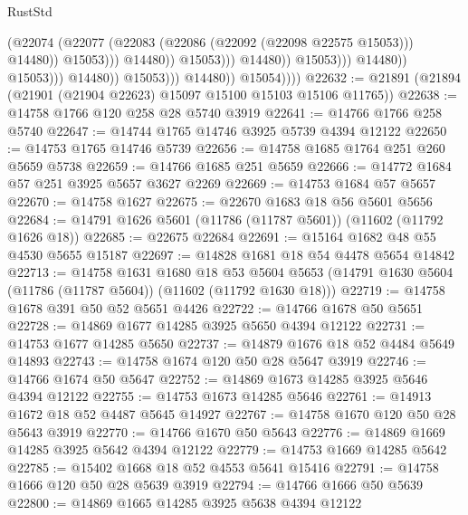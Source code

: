 \begin{lexlean}{RustStd}
\begin{coremodule}
                                                            (@22074
                                                              (@22077
                                                                (@22083
                                                                  (@22086
                                                                    (@22092 (@22098 @22575 @15053)))
                                                                  @14480))
                                                              @15053)))
                                                        @14480))
                                                    @15053)))
                                              @14480))
                                          @15053)))
                                    @14480))
                                @15053)))
                          @14480))
                      @15053)))
                @14480))
            @15054))))
@22632 := @21891 (@21894 (@21901 (@21904 @22623) @15097 @15100 @15103 @15106 @11765))
@22638 := @14758 @1766 @120 @258 @28 @5740 @3919
@22641 := @14766 @1766 @258 @5740
@22647 := @14744 @1765 @14746 @3925 @5739 @4394 @12122
@22650 := @14753 @1765 @14746 @5739
@22656 := @14758 @1685 @1764 @251 @260 @5659 @5738
@22659 := @14766 @1685 @251 @5659
@22666 := @14772 @1684 @57 @251 @3925 @5657 @3627 @2269
@22669 := @14753 @1684 @57 @5657
@22670 := @14758 @1627
@22675 := @22670 @1683 @18 @56 @5601 @5656
@22684 := @14791 @1626 @5601 (@11786 (@11787 @5601)) (@11602 (@11792 @1626 @18))
@22685 := @22675 @22684
@22691 := @15164 @1682 @48 @55 @4530 @5655 @15187
@22697 := @14828 @1681 @18 @54 @4478 @5654 @14842
@22713 := @14758
    @1631
    @1680
    @18
    @53
    @5604
    @5653
    (@14791 @1630 @5604 (@11786 (@11787 @5604)) (@11602 (@11792 @1630 @18)))
@22719 := @14758 @1678 @391 @50 @52 @5651 @4426
@22722 := @14766 @1678 @50 @5651
@22728 := @14869 @1677 @14285 @3925 @5650 @4394 @12122
@22731 := @14753 @1677 @14285 @5650
@22737 := @14879 @1676 @18 @52 @4484 @5649 @14893
@22743 := @14758 @1674 @120 @50 @28 @5647 @3919
@22746 := @14766 @1674 @50 @5647
@22752 := @14869 @1673 @14285 @3925 @5646 @4394 @12122
@22755 := @14753 @1673 @14285 @5646
@22761 := @14913 @1672 @18 @52 @4487 @5645 @14927
@22767 := @14758 @1670 @120 @50 @28 @5643 @3919
@22770 := @14766 @1670 @50 @5643
@22776 := @14869 @1669 @14285 @3925 @5642 @4394 @12122
@22779 := @14753 @1669 @14285 @5642
@22785 := @15402 @1668 @18 @52 @4553 @5641 @15416
@22791 := @14758 @1666 @120 @50 @28 @5639 @3919
@22794 := @14766 @1666 @50 @5639
@22800 := @14869 @1665 @14285 @3925 @5638 @4394 @12122

\end{coremodule}
\end{lexlean}
